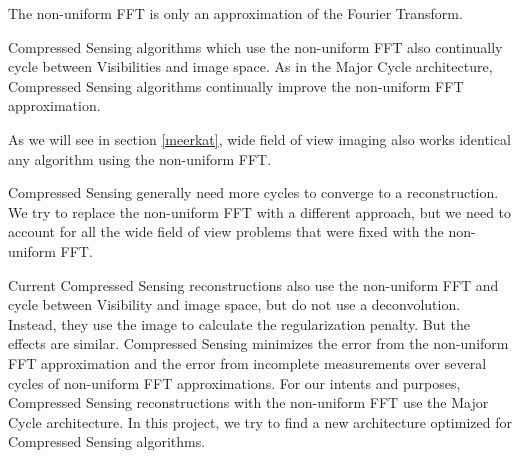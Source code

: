 The non-uniform FFT is only an approximation of the Fourier Transform. 

Compressed Sensing algorithms which use the non-uniform FFT also continually cycle between Visibilities and image space. As in the Major Cycle architecture, Compressed Sensing algorithms continually improve the non-uniform FFT approximation.

As we will see in section \ref{meerkat}, wide field of view imaging also works identical any algorithm using the non-uniform FFT.

Compressed Sensing generally need more cycles to converge to a reconstruction. We try to replace the non-uniform FFT with a different approach, but we need to account for all the wide field of view problems that were fixed with the non-uniform FFT.




Current Compressed Sensing reconstructions also use the non-uniform FFT and cycle between Visibility and image space\cite{girard2015sparse,dabbech2018cygnus}, but do not use a deconvolution. Instead, they use the image to calculate the regularization penalty. But the effects are similar. Compressed Sensing minimizes the error from the non-uniform FFT approximation and the error from incomplete measurements over several cycles of non-uniform FFT approximations.  For our intents and purposes, Compressed Sensing reconstructions with the non-uniform FFT use the Major Cycle architecture. In this project, we try to find a new architecture optimized for Compressed Sensing algorithms.

 






